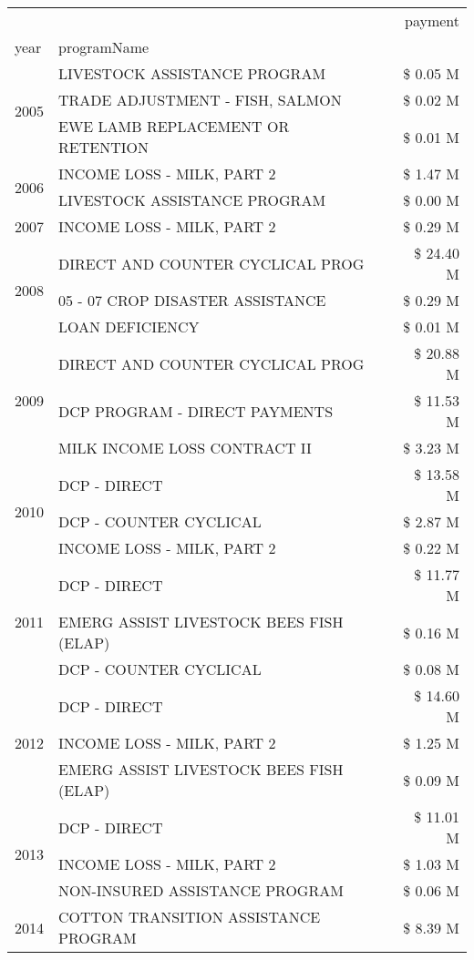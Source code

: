 \begin{tabular}{llr}
\toprule
 &  & payment \\
year & programName &  \\
\midrule
\multirow[t]{3}{*}{2005} & LIVESTOCK ASSISTANCE PROGRAM & \$ 0.05 M \\
 & TRADE ADJUSTMENT - FISH, SALMON & \$ 0.02 M \\
 & EWE LAMB REPLACEMENT OR RETENTION & \$ 0.01 M \\
\cline{1-3}
\multirow[t]{2}{*}{2006} & INCOME LOSS - MILK, PART 2 & \$ 1.47 M \\
 & LIVESTOCK ASSISTANCE PROGRAM & \$ 0.00 M \\
\cline{1-3}
2007 & INCOME LOSS - MILK, PART 2 & \$ 0.29 M \\
\cline{1-3}
\multirow[t]{3}{*}{2008} & DIRECT AND COUNTER CYCLICAL PROG & \$ 24.40 M \\
 & 05 - 07 CROP DISASTER ASSISTANCE & \$ 0.29 M \\
 & LOAN DEFICIENCY & \$ 0.01 M \\
\cline{1-3}
\multirow[t]{3}{*}{2009} & DIRECT AND COUNTER CYCLICAL PROG & \$ 20.88 M \\
 & DCP PROGRAM - DIRECT PAYMENTS & \$ 11.53 M \\
 & MILK INCOME LOSS CONTRACT II & \$ 3.23 M \\
\cline{1-3}
\multirow[t]{3}{*}{2010} & DCP - DIRECT & \$ 13.58 M \\
 & DCP - COUNTER CYCLICAL & \$ 2.87 M \\
 & INCOME LOSS - MILK, PART 2 & \$ 0.22 M \\
\cline{1-3}
\multirow[t]{3}{*}{2011} & DCP - DIRECT & \$ 11.77 M \\
 & EMERG ASSIST LIVESTOCK BEES FISH (ELAP) & \$ 0.16 M \\
 & DCP - COUNTER CYCLICAL & \$ 0.08 M \\
\cline{1-3}
\multirow[t]{3}{*}{2012} & DCP - DIRECT & \$ 14.60 M \\
 & INCOME LOSS - MILK, PART 2 & \$ 1.25 M \\
 & EMERG ASSIST LIVESTOCK BEES FISH (ELAP) & \$ 0.09 M \\
\cline{1-3}
\multirow[t]{3}{*}{2013} & DCP - DIRECT & \$ 11.01 M \\
 & INCOME LOSS - MILK, PART 2 & \$ 1.03 M \\
 & NON-INSURED ASSISTANCE PROGRAM & \$ 0.06 M \\
\cline{1-3}
\multirow[t]{3}{*}{2014} & COTTON TRANSITION ASSISTANCE PROGRAM & \$ 8.39 M \\

\end{tabular}
